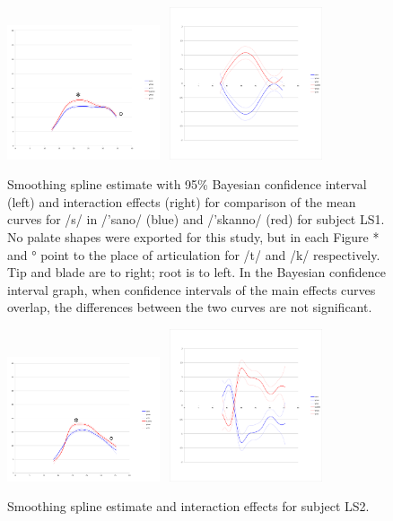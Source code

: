 \documentclass[output=paper]{LSP/langsci}
\begin{document}
\begin{figure}  
\includegraphics[width=0.4\textwidth]{illustrations/sprea_fig1a}~
\includegraphics[width=0.4\textwidth]{illustrations/sprea_fig1b}
\label{fig:1}   
\caption{Smoothing spline estimate with 95\% Bayesian confidence interval (left) and interaction effects (right) for comparison of the mean curves for /s/ in /'sano/ (blue) and /'skanno/ (red) for subject LS1. No palate shapes were exported for this study, but in each Figure * and ° point to the place of articulation for /t/ and /k/ respectively. Tip and blade are to right; root is to left. In the Bayesian confidence interval graph, when confidence intervals of the main effects curves overlap, the differences between the two curves are not significant.}
\end{figure}

\begin{figure}
\includegraphics[width=0.4\textwidth]{illustrations/sprea_fig2a}~
\includegraphics[width=0.4\textwidth]{illustrations/sprea_fig2b}
\label{fig:2}   
\caption{Smoothing spline estimate and interaction effects for subject LS2.}
\end{figure}
\end{document}
